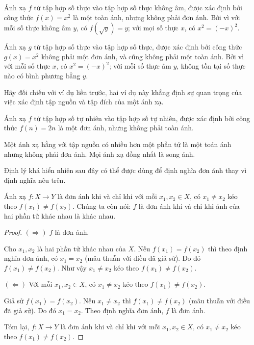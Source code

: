 \begin{example}
    Ánh xạ $f$ từ tập hợp số thực vào tập hợp số thực không âm, được xác định bởi công thức $f(x) = x^{2}$ là một toàn ánh, nhưng không phải đơn ánh. Bởi vì với mỗi số thực không âm $y$, có $f(\sqrt{y}) = y$; với mọi số thực $x$, có $x^{2} = {(-x)}^{2}$.
\end{example}

\begin{example}
    Ánh xạ $g$ từ tập hợp số thực vào tập hợp số thực, được xác định bởi công thức $g(x) = x^{2}$ không phải một đơn ánh, và cũng không phải một toàn ánh. Bởi vì với mỗi số thực $x$, có $x^{2} = {(-x)}^{2}$; với mỗi số thực âm $y$, không tồn tại số thực nào có bình phương bằng $y$.

    \noindent Hãy đối chiếu với ví dụ liền trước, hai ví dụ này khẳng định sự quan trọng của việc xác định tập nguồn và tập đích của một ánh xạ.
\end{example}

\begin{example}
    Ánh xạ $f$ từ tập hợp số tự nhiên vào tập hợp số tự nhiên, được xác định bởi công thức $f(n) = 2n$ là một đơn ánh, nhưng không phải toàn ánh.
\end{example}

\begin{example}
    Một ánh xạ hằng với tập nguồn có nhiều hơn một phần tử là một toán ánh nhưng không phải đơn ánh. Mọi ánh xạ đồng nhất là song ánh.
\end{example}

Định lý khá hiển nhiên sau đây có thể được dùng để định nghĩa đơn ánh thay vì định nghĩa nêu trên.

\begin{theorem}\label{theorem:one-to-one-mapping}
    Ánh xạ $f: X\to Y$ là đơn ánh khi và chỉ khi với mỗi $x_{1}, x_{2}\in X$, có $x_{1}\ne x_{2}$ kéo theo $f(x_{1})\ne f(x_{2})$. Chúng ta còn nói: $f$ là đơn ánh khi và chỉ khi ảnh của hai phần tử khác nhau là khác nhau.
\end{theorem}

\begin{proof}
    $(\Rightarrow)$ $f$ là đơn ánh.

    Cho $x_{1}, x_{2}$ là hai phần tử khác nhau của $X$. Nếu $f(x_{1}) = f(x_{2})$ thì theo định nghĩa đơn ánh, có $x_{1} = x_{2}$ (mâu thuẫn với điều đã giả sử). Do đó $f(x_{1})\ne f(x_{2})$. Như vậy $x_{1}\ne x_{2}$ kéo theo $f(x_{1})\ne f(x_{2})$.

    $(\Leftarrow)$ Với mỗi $x_{1}, x_{2}\in X$, có $x_{1}\ne x_{2}$ kéo theo $f(x_{1})\ne f(x_{2})$.

    Giả sử $f(x_{1}) = f(x_{2})$. Nếu $x_{1}\ne x_{2}$ thì $f(x_{1})\ne f(x_{2})$ (mâu thuẫn với điều đã giả sử). Do đó $x_{1} = x_{2}$. Theo định nghĩa đơn ánh, $f$ là đơn ánh.

    Tóm lại, $f: X\to Y$ là đơn ánh khi và chỉ khi với mỗi $x_{1}, x_{2}\in X$, có $x_{1}\ne x_{2}$ kéo theo $f(x_{1})\ne f(x_{2})$.
\end{proof}

